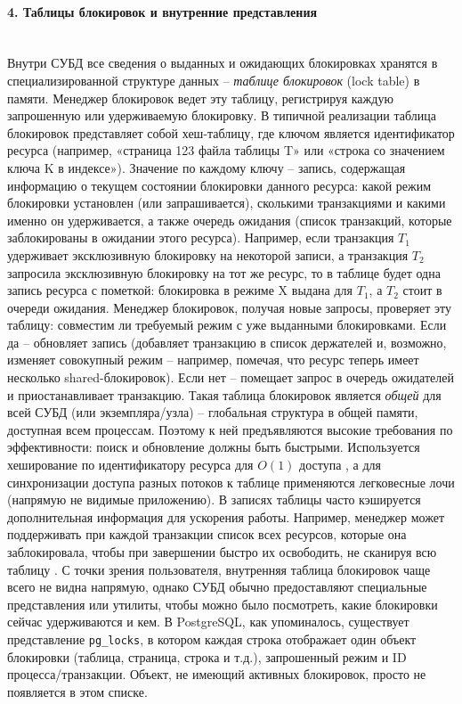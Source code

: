 \paragraph{4. Таблицы блокировок и внутренние представления} ~\\
 Внутри СУБД все сведения о выданных и ожидающих блокировках хранятся в специализированной структуре данных – \textit{таблице блокировок} (lock table) в памяти. Менеджер блокировок ведет эту таблицу, регистрируя каждую запрошенную или удерживаемую блокировку. В типичной реализации таблица блокировок представляет собой хеш-таблицу, где ключом является идентификатор ресурса (например, «страница 123 файла таблицы T» или «строка со значением ключа K в индексе»). Значение по каждому ключу – запись, содержащая информацию о текущем состоянии блокировки данного ресурса: какой режим блокировки установлен (или запрашивается), сколькими транзакциями и какими именно он удерживается, а также очередь ожидания (список транзакций, которые заблокированы в ожидании этого ресурса). 
 Например, если транзакция $T_1$ удерживает эксклюзивную блокировку на некоторой записи, а транзакция $T_2$ запросила эксклюзивную блокировку на тот же ресурс, то в таблице будет одна запись ресурса с пометкой: блокировка в режиме X выдана для $T_1$, а $T_2$ стоит в очереди ожидания. Менеджер блокировок, получая новые запросы, проверяет эту таблицу: совместим ли требуемый режим с уже выданными блокировками. Если да – обновляет запись (добавляет транзакцию в список держателей и, возможно, изменяет совокупный режим – например, помечая, что ресурс теперь имеет несколько shared-блокировок). Если нет – помещает запрос в очередь ожидателей и приостанавливает транзакцию. Такая таблица блокировок является \textit{общей} для всей СУБД (или экземпляра/узла) – глобальная структура в общей памяти, доступная всем процессам. Поэтому к ней предъявляются высокие требования по эффективности: поиск и обновление должны быть быстрыми. Используется хеширование по идентификатору ресурса для $O(1)$ доступа \autocite{DMSSMthed}, а для синхронизации доступа разных потоков к таблице применяются легковесные лочи (напрямую не видимые приложению). 
 В записях таблицы часто кэшируется дополнительная информация для ускорения работы. Например, менеджер может поддерживать при каждой транзакции список всех ресурсов, которые она заблокировала, чтобы при завершении быстро их освободить, не сканируя всю таблицу \autocite{Silberschatz}. С точки зрения пользователя, внутренняя таблица блокировок чаще всего не видна напрямую, однако СУБД обычно предоставляют специальные представления или утилиты, чтобы можно было посмотреть, какие блокировки сейчас удерживаются и кем. В PostgreSQL, как упоминалось, существует представление \texttt{pg\_locks}, в котором каждая строка отображает один объект блокировки (таблица, страница, строка и т.д.), запрошенный режим и ID процесса/транзакции. Объект, не имеющий активных блокировок, просто не появляется в этом списке.
